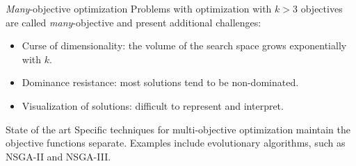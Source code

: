 \documentclass[aspectratio=169,xcolor=dvipsnames]{beamer}
\begin{document}
\begin{frame}{\textit{Many}-objective optimization}
    Problems with optimization with $k > 3$ objectives are called \textit{many}-objective and present additional challenges:
    \begin{itemize}
        \item Curse of dimensionality: the volume of the search space grows exponentially with $k$.
        \item Dominance resistance: most solutions tend to be non-dominated.
        \item Visualization of solutions: difficult to represent and interpret.
    \end{itemize}

    \vspace{1em}
    \begin{block}{State of the art}
        Specific techniques for multi-objective optimization maintain the objective functions separate. Examples include evolutionary algorithms, such as \alert{NSGA-II} and \alert{NSGA-III}.
    \end{block}
\end{frame}









\end{document}
